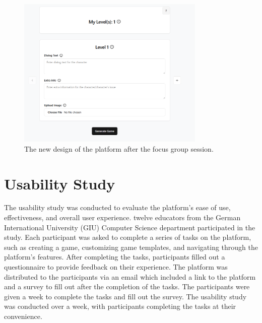 \begin{figure}
    \centering
    \includegraphics[width=0.8\textwidth]{figures/Diagnose_Game/Instructor_Portal_Diagnose_Game.png}
    \caption{The new design of the platform after the focus group session.}
    \label{fig:design}
\end{figure}

\section{Usability Study}

The usability study was conducted to evaluate the platform's ease of use, effectiveness, and overall user experience. twelve educators from the German International University (GIU) Computer Science department participated in the study. Each participant was asked to complete a series of tasks on the platform, such as creating a game, customizing game templates, and navigating through the platform's features. After completing the tasks, participants filled out a questionnaire to provide feedback on their experience. The platform was distributed to the participants via an email which included a link to the platform and a survey to fill out after the completion of the tasks. The participants were given a week to complete the tasks and fill out the survey. The usability study was conducted over a week, with participants completing the tasks at their convenience.

